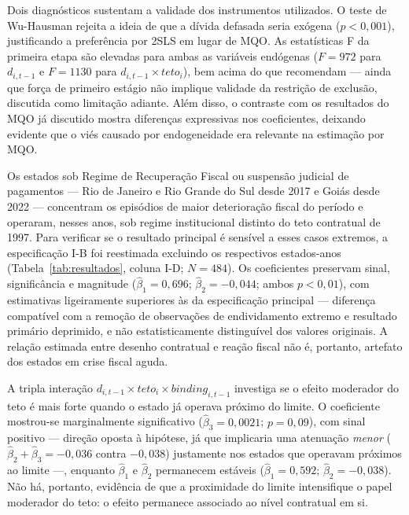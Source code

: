Dois diagnósticos sustentam a validade dos instrumentos utilizados. O teste de Wu-Hausman rejeita a ideia de que a dívida defasada seria exógena ($p < 0{,}001$), justificando a preferência por 2SLS em lugar de MQO. As estatísticas F da primeira etapa são elevadas para ambas as variáveis endógenas ($F = 972$ para $d_{i,t-1}$ e $F = 1130$ para $d_{i,t-1} \times teto_i$), bem acima do que recomendam  --- ainda que força de primeiro estágio não implique validade da restrição de exclusão, discutida como limitação adiante. Além disso, o contraste com os resultados do MQO já discutido mostra diferenças expressivas nos coeficientes, deixando evidente que o viés causado por endogeneidade era relevante na estimação por MQO.

Os estados sob Regime de Recuperação Fiscal ou suspensão judicial de pagamentos --- Rio de Janeiro e Rio Grande do Sul desde 2017 e Goiás desde 2022 --- concentram os episódios de maior deterioração fiscal do período e operaram, nesses anos, sob regime institucional distinto do teto contratual de 1997. Para verificar se o resultado principal é sensível a esses casos extremos, a especificação I-B foi reestimada excluindo os respectivos estados-anos (Tabela~\ref{tab:resultados}, coluna I-D; $N = 484$). Os coeficientes preservam sinal, significância e magnitude ($\hat{\beta}_1 = 0{,}696$; $\hat{\beta}_2 = -0{,}044$; ambos $p < 0{,}01$), com estimativas ligeiramente superiores às da especificação principal --- diferença compatível com a remoção de observações de endividamento extremo e resultado primário deprimido, e não estatisticamente distinguível dos valores originais. A relação estimada entre desenho contratual e reação fiscal não é, portanto, artefato dos estados em crise fiscal aguda.

A tripla interação $d_{i,t-1} \times teto_i \times binding_{i,t-1}$ investiga se o efeito moderador do teto é mais forte quando o estado já operava próximo do limite. O coeficiente mostrou-se marginalmente significativo ($\hat{\beta}_3 = 0{,}0021$; $p = 0{,}09$), com sinal positivo --- direção oposta à hipótese, já que implicaria uma atenuação \emph{menor} ($\hat{\beta}_2 + \hat{\beta}_3 = -0{,}036$ contra $-0{,}038$) justamente nos estados que operavam próximos ao limite ---, enquanto $\hat{\beta}_1$ e $\hat{\beta}_2$ permanecem estáveis ($\hat{\beta}_1 = 0{,}592$; $\hat{\beta}_2 = -0{,}038$). Não há, portanto, evidência de que a proximidade do limite intensifique o papel moderador do teto: o efeito permanece associado ao nível contratual em si.

